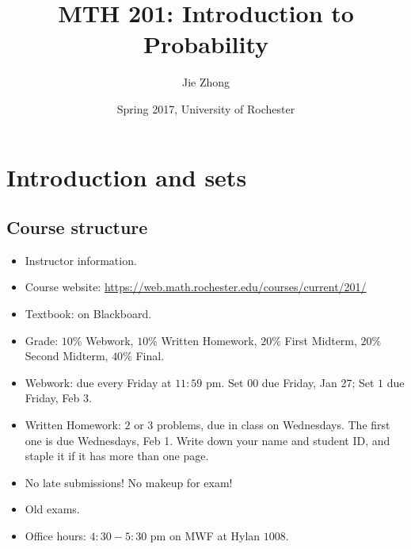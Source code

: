


	\title{\bf{MTH 201: Introduction to Probability}}
	\date{Spring 2017, University of Rochester}
	\author{Jie Zhong}



	\maketitle
	\newpage
	\tableofcontents
	\newpage


\section{Introduction and sets} 
  \subsection{Course structure}
  \label{subsec:course}
  \begin{itemize}
  \item Instructor information.
  \item Course website: \href{https://web.math.rochester.edu/courses/current/201/}{https://web.math.rochester.edu/courses/current/201/}
  \item Textbook: on Blackboard.
  \item Grade: $10\%$ Webwork, $10\%$ Written Homework, $20\%$ First Midterm,
    $20\%$ Second Midterm, $40\%$ Final.
  \item Webwork: due every Friday at $11:59$ pm. Set $00$ due Friday, Jan 27;
    Set $1$ due Friday, Feb 3.
  \item Written Homework: $2$ or $3$ problems, due in class on Wednesdays. The
    first one is due Wednesdays, Feb 1. Write down your name and student ID, and
    staple it if it has more than one page.
  \item No late submissions! No makeup for exam!
  \item Old exams.
  \item Office hours: $4:30-5:30$ pm on MWF at Hylan $1008$.
  \end{itemize}
